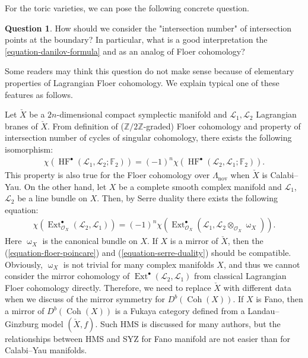 \documentclass[a4paper,dvipdfmx,reqno,12pt]{amsart}
\theoremstyle{definition}
\newtheorem{question}[theorem]{Question}
\newcommand{\mcal}[1]{\mathcal{#1}}%
\newcommand{\opn}[1]{\operatorname{#1}}
\numberwithin{equation}{section}
\begin{document}
For the toric varieties, we can pose the following 
concrete question.

\begin{question}
How should we consider the "intersection number" 
of intersection points at the boundary? In particular,
what is a good interpretation the 
\cref{equation-danilov-formula} and 
as an analog of Floer cohomology?
\end{question}

Some readers may think this question do not make sense
because of elementary properties of 
Lagrangian Floer cohomology. 
We explain typical one of these features as follows.

Let $\check{X}$ be a $2n$-dimensional 
compact symplectic manifold and 
$\mathscr{L}_1,\mathscr{L}_2$
Lagrangian branes of $\check{X}$.
From definition of ($\mathbb{Z}/2\mathbb{Z}$-graded) 
Floer cohomology and 
property of intersection number of cycles of singular 
cohomology, there exists the
following isomorphism:
\begin{align}
\label{equation-floer-poincare}
\chi (\opn{HF}^{\bullet}(\mathscr{L}_1,\mathscr{L}_2;\mathbb{F}_2))
=(-1)^{n} 
\chi(\opn{HF}^{\bullet}(\mathscr{L}_2,\mathscr{L}_1;\mathbb{F}_2)).
\end{align}
This property is also true for 
the Floer cohomology over $\Lambda_{\opn{nov}}$ when 
$\check{X}$ is Calabi--Yau.
On the other hand, let $X$ be a complete smooth 
complex manifold and $\mathcal{L}_1$, $\mathcal{L}_2$ be a
line bundle on $X$. Then, by Serre duality there exists 
the following equation:
\begin{align}
\label{equation-serre-duality}
\chi(\opn{Ext}^{\bullet}_{\mcal{O}_X}
(\mcal{L}_2,\mcal{L}_1))
= (-1)^{n}\chi(\opn{Ext}^{\bullet}_{\mcal{O}_X}
(\mcal{L}_1,\mcal{L}_2\otimes_{\mathcal{O}_X} \upomega_X)).
\end{align}
Here $\upomega_X$ is the canonical bundle on $X$.
If $X$ is a mirror of $\check{X}$, then 
the (\ref{equation-floer-poincare}) and 
(\ref{equation-serre-duality}) should be compatible.
Obviously, 
$\upomega_X$ is not trivial for many complex manifolds $X$,
and thus we cannot consider the mirror cohomology of 
$\opn{Ext}^{\bullet}(\mathcal{L}_2,\mathcal{L}_1)$
from classical Lagrangian Floer cohomology directly.
Therefore, we need to replace $\check{X}$ 
with different data when we discuss of the mirror 
symmetry for $D^{b}(\opn{Coh}(X))$. 
If $X$ is Fano, then a
mirror of $D^{b}(\opn{Coh}(X))$ is a Fukaya 
category defined from a Landau--Ginzburg model
$(\check{X},f)$.
Such HMS is discussed for many authors, 
but the relationships between HMS and SYZ
for Fano manifold
are not easier than 
for Calabi--Yau manifolds.
\end{document}
